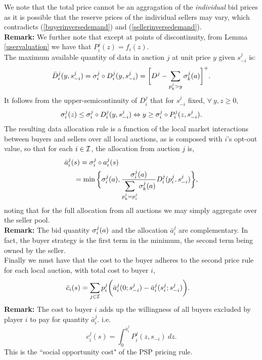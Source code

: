 We note that
the total price cannot be an aggragation of the
\emph{individual} bid prices as it is possible that the reserve prices
of the individual sellers may vary, which contradicts
(\ref{buyerinversedemand}) and (\ref{sellerinversedemand}).\\
\textbf{Remark:} We further note that except at points of discontinuity, from
Lemma \ref{uservaluation} we have that $P_i^j(z) = f_i(z)$. \\
\fi
The maximum available quantity of data in auction
$j$ at unit price $y$ given $s_{-i}^j$ is: 
\begin{align}
\begin{split}\label{datacomposed}
    \bar{D}_i^j(y,s_{-i}^j) = \sigma_i^j \circ D_i^j( y,s_{-i}^j)
    = \bigg\lbrack D^j - \sum_{p_k^j> y} \sigma_k^j(a)\bigg\rbrack^+.
\end{split}
\end{align}
It follows from the upper-semicontinuity of $D_i^j$ that for $s_{-i}^j$ fixed, $\forall \ y,z \ge 0$,
\begin{equation}\label{dtop}
    \sigma_i^j(z) \le \sigma_i^j \circ D_i^j(y,s_{-i}^j) \Leftrightarrow y \ge \sigma_i^j
\circ P_i^j(z,s_{-i}^j).
\end{equation}
The resulting data allocation rule is a function of the local market
interactions between buyers and sellers over all local auctions, as is composed with $i$'s opt-out value, so that for each $i \in \mathcal{I}$, the
allocation from auction $j$ is,
\begin{align}\label{dataallocation}
\begin{split}
    \bar{a}_i^j(&s) = \sigma_i^j \circ a_i^j(s) \\
    &= \min\bigg\lbrace \sigma_i^j(a), 
    \frac{\sigma_i^j(a)}{\displaystyle\sum_{p_k^j= p_i^j}\sigma_k^j(a)} 
D_i^j(p_i^j,s_{-i}^j)\bigg\rbrace,
\end{split}
\end{align}
noting that for the full allocation from all auctions we may simply aggregate
over the seller pool. \\
\textbf{Remark:} The bid quantity $\sigma_i^j(a)$ and the allocation $\bar{a}_i^j$
are complementary. In fact, the buyer strategy is the first term in the
minimum, the second term being owned by the seller. \\
Finally we must have that the cost to the buyer adheres to the second price
rule for each local auction, with total cost to buyer $i$,
\begin{align}\label{datacost}
\begin{split}
    \bar{c}_i(s) &= \displaystyle\sum_{j\in\mathcal{I}} 
    p_i^j \bigg(\bar{a}_i^j(0; s_{-i}^j)
    -\bar{a}_i^j(s_i^j;s_{-i}^j)\bigg).
\end{split}
\end{align}
\textbf{Remark:} The cost to buyer $i$ adds up the willingness
of all buyers excluded by player $i$ to pay for quantity $\bar{a}_i^j$. i.e.
$$
    c_i^j(s) = \displaystyle\int_0^{\bar{a}_i^j} P_i^j(z, s_{-i}) \ dz.
$$
This is the ``social opportunity cost" of the PSP pricing rule.

